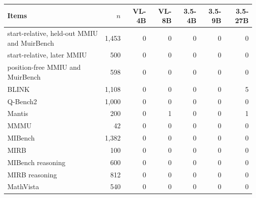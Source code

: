 \begin{tabular}{@{}lrrrrrr@{}}
\toprule
Items & $n$ & VL-4B & VL-8B & 3.5-4B & 3.5-9B & 3.5-27B \\
\midrule
start-relative, held-out MMIU and MuirBench & 1,453 & 0 & 0 & 0 & 0 & 0 \\
start-relative, later MMIU & 500 & 0 & 0 & 0 & 0 & 0 \\
position-free MMIU and MuirBench & 598 & 0 & 0 & 0 & 0 & 0 \\
BLINK & 1,108 & 0 & 0 & 0 & 0 & 5 \\
Q-Bench2 & 1,000 & 0 & 0 & 0 & 0 & 0 \\
Mantis & 200 & 0 & 1 & 0 & 0 & 1 \\
MMMU & 42 & 0 & 0 & 0 & 0 & 0 \\
MIBench & 1,382 & 0 & 0 & 0 & 0 & 0 \\
MIRB & 100 & 0 & 0 & 0 & 0 & 0 \\
MIBench reasoning & 600 & 0 & 0 & 0 & 0 & 0 \\
MIRB reasoning & 812 & 0 & 0 & 0 & 0 & 0 \\
MathVista & 540 & 0 & 0 & 0 & 0 & 0 \\
\bottomrule
\end{tabular}
